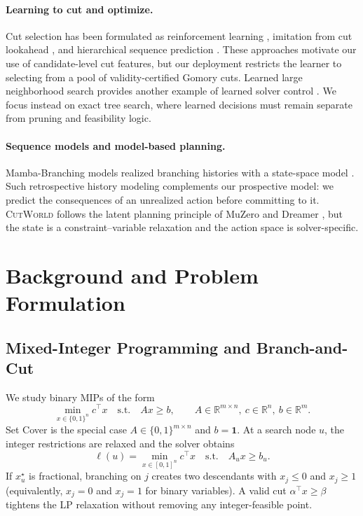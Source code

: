 \documentclass[11pt,a4paper]{article}
\newcommand{\CutWorld}{\textsc{CutWorld}}
\newcommand{\R}{\mathbb{R}}
\begin{document}
\paragraph{Learning to cut and optimize.}
Cut selection has been formulated as reinforcement learning
\citep{tang2020reinforcement}, imitation from cut lookahead
\citep{paulus2022learning}, and hierarchical sequence prediction \citep{wang2023hierarchical}. These approaches motivate our use of candidate-level cut features, but our deployment restricts the learner to selecting from a pool of validity-certified Gomory cuts. Learned large neighborhood search provides another example of learned solver control \citep{sonnerat2021learning}. We focus instead on exact tree search, where learned decisions must remain separate from pruning and feasibility logic.

\paragraph{Sequence models and model-based planning.}
Mamba-Branching models realized branching histories with a state-space model \citep{zhang2026mambabranchin}. Such retrospective history modeling complements our prospective model: we predict the consequences of an unrealized action before committing to it. \CutWorld{} follows the latent planning principle of MuZero and Dreamer
\citep{schrittwieser2020mastering,hafner2020dream}, but the state is a constraint--variable relaxation and the action space is solver-specific.


\section{Background and Problem Formulation}
\label{sec:background}

\subsection{Mixed-Integer Programming and Branch-and-Cut}

We study binary MIPs of the form
\begin{equation}
  \min_{x\in\{0,1\}^{n}} c^\top x
  \quad\text{s.t.}\quad
  Ax\ge b,
  \qquad
  A\in\R^{m\times n},\ c\in\R^n,\ b\in\R^m .
  \label{eq:mip}
\end{equation}
Set Cover is the special case $A\in\{0,1\}^{m\times n}$ and
$b=\mathbf{1}$. At a search node $u$, the integer restrictions are relaxed
and the solver obtains
\begin{equation}
  \ell(u)=\min_{x\in[0,1]^n} c^\top x
  \quad\text{s.t.}\quad A_u x\ge b_u .
  \label{eq:lp}
\end{equation}
If $x_u^\star$ is fractional, branching on $j$ creates two descendants with $x_j\le 0$ and $x_j\ge 1$ (equivalently, $x_j=0$ and $x_j=1$ for binary variables). A valid cut $\alpha^\top x\ge\beta$ tightens the LP relaxation without removing any integer-feasible point.
\end{document}
